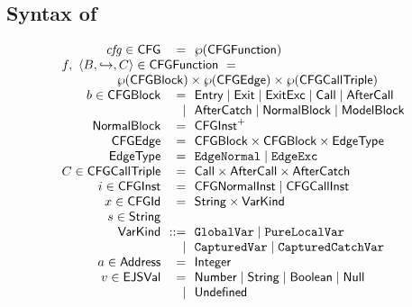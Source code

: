 \subsection{Syntax of \CFG}
\small
\[
\begin{array}{r@{~~}r@{~~}l@{}ll}
\embox{cfg} \in \CFG & = & \powerset{\CFGFunction} & \\
\multicolumn{3}{l}{f,\ \langle B, \hookrightarrow, C \rangle \in \CFGFunction \ =}\\
\multicolumn{3}{r}{
 \powerset{\CFGBlock} \times \powerset{\CFGEdge}
\times \powerset{\CFGCallTriple}} & \\
b \in \CFGBlock & = & \multicolumn{2}{@{}l}{\Entry \mid \Exit \mid \ExitExc \mid \Call \mid \AfterCall}\\
&\mid& \multicolumn{2}{@{}l}{\AfterCatch \mid \NormalBlock \mid \ModelBlock} \\
\NormalBlock & = & \CFGInst^+ & \\
\CFGEdge & = & \CFGBlock \times \CFGBlock \times \EdgeType & \\
\EdgeType & = & \EdgeNormal \mid \EdgeExc & \\
C \in \CFGCallTriple & = & \Call \times \AfterCall \times \AfterCatch & \\

i \in \CFGInst & = & \CFGNormalInst \mid \CFGCallInst &
\\

x \in \CFGId & = & \String \times \SF{VarKind} &
\\

s \in \String &&&\\

\SF{VarKind} & ::= &
\multicolumn{2}{@{} l}{
\TT{GlobalVar} \mid \TT{PureLocalVar}}\\
&  \mid & \TT{CapturedVar} \mid \TT{CapturedCatchVar}
\\

a \in \SF{Address} & = & \SF{Integer} &
\\

v \in \SF{EJSVal} & = &
\multicolumn{2}{@{} l}{
 \SF{Number} \mid \String \mid \SF{Boolean} \mid \SF{Null}}\\
& \mid &\SF{Undefined}
\end{array}
\]

